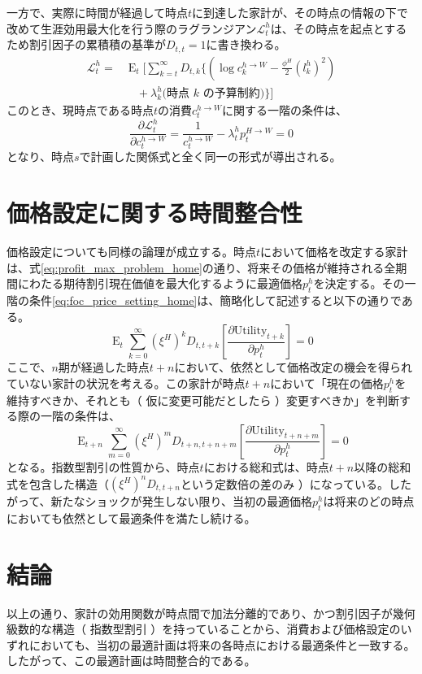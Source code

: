一方で、実際に時間が経過して時点\(t\)に到達した家計が、その時点の情報の下で改めて生涯効用最大化を行う際のラグランジアン\(\mathcal{L}_t^h\)は、その時点を起点とするため割引因子の累積積の基準が\(D_{t,t}=1\)に書き換わる。
\begin{equation}
\begin{aligned}
\mathcal{L}_t^h = & \operatorname{E}_t \Biggl[ \sum_{k=t}^{\infty}D_{t,k}\Biggl\{ \left( \log c_k^{h \to W}- \frac{\phi^H}{2}(l_k^h)^2 \right) \\
& \quad + \lambda_k^h \biggl( \text{時点 }k \text{ の予算制約}\biggr) \Biggr\}\Biggr]
\end{aligned}
\end{equation}
このとき、現時点である時点\(t\)の消費\(c_t^{h \to W}\)に関する一階の条件は、
\begin{equation}
\frac{\partial \mathcal{L}_t^h}{\partial c_t^{h \to W}}= \frac{1}{c_t^{h \to W}}- \lambda_t^h p_t^{H \to W}= 0
\end{equation}
となり、時点\(s\)で計画した関係式と全く同一の形式が導出される。

\section{価格設定に関する時間整合性}
価格設定についても同様の論理が成立する。時点\(t\)において価格を改定する家計は、式\eqref{eq:profit_max_problem_home}の通り、将来その価格が維持される全期間にわたる期待割引現在価値を最大化するように最適価格\(p_t^h\)を決定する。その一階の条件\eqref{eq:foc_price_setting_home}は、簡略化して記述すると以下の通りである。
\begin{equation}
\operatorname{E}_t \sum_{k=0}^{\infty}(\xi^H)^k D_{t,t+k}\left[ \frac{\partial \text{Utility}_{t+k}}{\partial p_t^h}\right] = 0
\end{equation}
ここで、\(n\)期が経過した時点\(t+n\)において、依然として価格改定の機会を得られていない家計の状況を考える。この家計が時点\(t+n\)において「現在の価格\(p_t^h\)を維持すべきか、それとも（ 仮に変更可能だとしたら ）変更すべきか」を判断する際の一階の条件は、
\begin{equation}
\operatorname{E}_{t+n}\sum_{m=0}^{\infty}(\xi^H)^m D_{t+n,t+n+m}\left[ \frac{\partial \text{Utility}_{t+n+m}}{\partial p_t^h}\right] = 0
\end{equation}
となる。指数型割引の性質から、時点\(t\)における総和式は、時点\(t+n\)以降の総和式を包含した構造（\((\xi^H)^n D_{t,t+n}\)という定数倍の差のみ ）になっている。したがって、新たなショックが発生しない限り、当初の最適価格\(p_t^h\)は将来のどの時点においても依然として最適条件を満たし続ける。

\section{結論}
以上の通り、家計の効用関数が時点間で加法分離的であり、かつ割引因子が幾何級数的な構造（ 指数型割引 ）を持っていることから、消費および価格設定のいずれにおいても、当初の最適計画は将来の各時点における最適条件と一致する。したがって、この最適計画は時間整合的である。